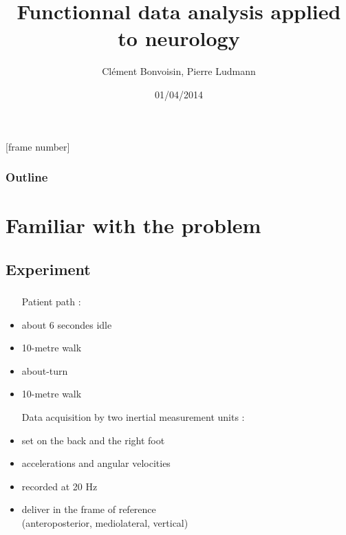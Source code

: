 \documentclass{beamer}
\title[Signal segmentation]{Functionnal data analysis applied to neurology}
\author{Clément Bonvoisin, Pierre Ludmann}
\institute{CMLA (ENS Cachan), Cognac-G (Paris V)}
\date{01/04/2014}
\begin{document}
[frame number]

\begin{frame}
\titlepage
\end{frame}

\begin{frame}
\frametitle{Outline}
  \tableofcontents[hideallsubsections]
\end{frame}


\section{Familiar with the problem}
\subsection{Experiment}

\begin{frame}
\frametitle{}

\begin{itemize}

\item[Patient] path : 
\item about 6 secondes idle
\item 10-metre walk
\item about-turn
\item 10-metre walk

\item[Data] acquisition by two inertial measurement units : 
\item set on the back and the right foot
\item accelerations and angular velocities
\item recorded at 20 Hz
\item deliver in the frame of reference \\(anteroposterior, mediolateral, vertical)

\end{itemize}

\end{frame}
\end{document}
